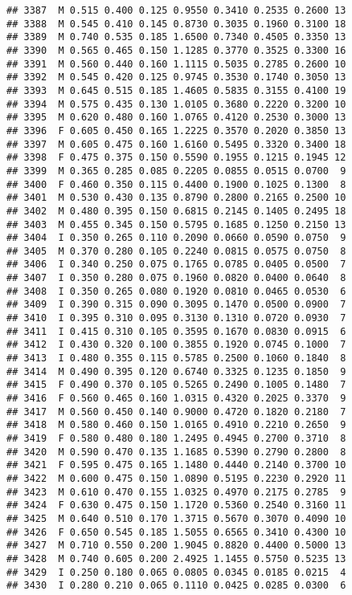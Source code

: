 \documentclass[
]{article}
\begin{document}
\begin{verbatim}
## 3387  M 0.515 0.400 0.125 0.9550 0.3410 0.2535 0.2600 13
## 3388  M 0.545 0.410 0.145 0.8730 0.3035 0.1960 0.3100 18
## 3389  M 0.740 0.535 0.185 1.6500 0.7340 0.4505 0.3350 13
## 3390  M 0.565 0.465 0.150 1.1285 0.3770 0.3525 0.3300 16
## 3391  M 0.560 0.440 0.160 1.1115 0.5035 0.2785 0.2600 10
## 3392  M 0.545 0.420 0.125 0.9745 0.3530 0.1740 0.3050 13
## 3393  M 0.645 0.515 0.185 1.4605 0.5835 0.3155 0.4100 19
## 3394  M 0.575 0.435 0.130 1.0105 0.3680 0.2220 0.3200 10
## 3395  M 0.620 0.480 0.160 1.0765 0.4120 0.2530 0.3000 13
## 3396  F 0.605 0.450 0.165 1.2225 0.3570 0.2020 0.3850 13
## 3397  M 0.605 0.475 0.160 1.6160 0.5495 0.3320 0.3400 18
## 3398  F 0.475 0.375 0.150 0.5590 0.1955 0.1215 0.1945 12
## 3399  M 0.365 0.285 0.085 0.2205 0.0855 0.0515 0.0700  9
## 3400  F 0.460 0.350 0.115 0.4400 0.1900 0.1025 0.1300  8
## 3401  M 0.530 0.430 0.135 0.8790 0.2800 0.2165 0.2500 10
## 3402  M 0.480 0.395 0.150 0.6815 0.2145 0.1405 0.2495 18
## 3403  M 0.455 0.345 0.150 0.5795 0.1685 0.1250 0.2150 13
## 3404  I 0.350 0.265 0.110 0.2090 0.0660 0.0590 0.0750  9
## 3405  M 0.370 0.280 0.105 0.2240 0.0815 0.0575 0.0750  8
## 3406  I 0.340 0.250 0.075 0.1765 0.0785 0.0405 0.0500  7
## 3407  I 0.350 0.280 0.075 0.1960 0.0820 0.0400 0.0640  8
## 3408  I 0.350 0.265 0.080 0.1920 0.0810 0.0465 0.0530  6
## 3409  I 0.390 0.315 0.090 0.3095 0.1470 0.0500 0.0900  7
## 3410  I 0.395 0.310 0.095 0.3130 0.1310 0.0720 0.0930  7
## 3411  I 0.415 0.310 0.105 0.3595 0.1670 0.0830 0.0915  6
## 3412  I 0.430 0.320 0.100 0.3855 0.1920 0.0745 0.1000  7
## 3413  I 0.480 0.355 0.115 0.5785 0.2500 0.1060 0.1840  8
## 3414  M 0.490 0.395 0.120 0.6740 0.3325 0.1235 0.1850  9
## 3415  F 0.490 0.370 0.105 0.5265 0.2490 0.1005 0.1480  7
## 3416  F 0.560 0.465 0.160 1.0315 0.4320 0.2025 0.3370  9
## 3417  M 0.560 0.450 0.140 0.9000 0.4720 0.1820 0.2180  7
## 3418  M 0.580 0.460 0.150 1.0165 0.4910 0.2210 0.2650  9
## 3419  F 0.580 0.480 0.180 1.2495 0.4945 0.2700 0.3710  8
## 3420  M 0.590 0.470 0.135 1.1685 0.5390 0.2790 0.2800  8
## 3421  F 0.595 0.475 0.165 1.1480 0.4440 0.2140 0.3700 10
## 3422  M 0.600 0.475 0.150 1.0890 0.5195 0.2230 0.2920 11
## 3423  M 0.610 0.470 0.155 1.0325 0.4970 0.2175 0.2785  9
## 3424  F 0.630 0.475 0.150 1.1720 0.5360 0.2540 0.3160 11
## 3425  M 0.640 0.510 0.170 1.3715 0.5670 0.3070 0.4090 10
## 3426  F 0.650 0.545 0.185 1.5055 0.6565 0.3410 0.4300 10
## 3427  M 0.710 0.550 0.200 1.9045 0.8820 0.4400 0.5000 13
## 3428  M 0.740 0.605 0.200 2.4925 1.1455 0.5750 0.5235 13
## 3429  I 0.250 0.180 0.065 0.0805 0.0345 0.0185 0.0215  4
## 3430  I 0.280 0.210 0.065 0.1110 0.0425 0.0285 0.0300  6

\end{verbatim}
\end{document}
